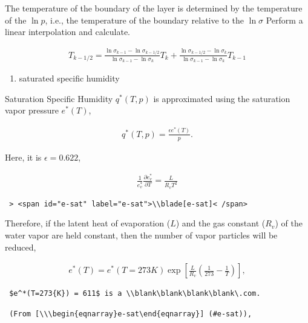 The temperature of the boundary of the layer is determined by the
temperature of the \(\ln p\), i.e., the temperature of the boundary
relative to the \(\ln \sigma\) Perform a linear interpolation and
calculate.

\begin{eqnarray}
  T_{k-1/2} = \frac{\ln \sigma_{k-1} - \ln \sigma_{k-1/2}}
                   {\ln \sigma_{k-1} - \ln \sigma_k      } T_k
            + \frac{\ln \sigma_{k-1/2} - \ln \sigma_k}
                   {\ln \sigma_{k-1} - \ln \sigma_k      } T_{k-1}
\end{eqnarray}

\begin{enumerate}
\def\labelenumi{\arabic{enumi}.}
\setcounter{enumi}{4}
\tightlist
\item
  saturated specific humidity
\end{enumerate}

Saturation Specific Humidity \(q^*(T,p)\) is approximated using the
saturation vapor pressure \(e^*(T)\),

\begin{eqnarray}
q^*(T,p) = \frac{\epsilon e^*(T)}{p} .
\end{eqnarray}

Here, it is \(\epsilon=0.622\),

\begin{eqnarray}
\frac{1}{e^*_v} \frac{\partial e^*_v}{\partial T} = \frac{L}{R_v T^2}
\end{eqnarray}

\begin{verbatim}
 > <span id="e-sat" label="e-sat">\\blade[e-sat]< /span>
\end{verbatim}

Therefore, if the latent heat of evaporation (\(L\)) and the gas
constant (\(R_v\)) of the water vapor are held constant, then the number
of vapor particles will be reduced,

\begin{eqnarray}
  e^*(T) = e^*(T=273{K}) 
                      \exp \left[ \frac{L}{R_v} 
                            \left( \frac{1}{273} - \frac{1}{T} \right)
                       \right] ,
\end{eqnarray}

\begin{verbatim}
 $e^*(T=273{K}) = 611$ is a \\blank\blank\blank\blank\.com.

 (From [\\\begin{eqnarray}e-sat\end{eqnarray}] (#e-sat)),
\end{verbatim}

